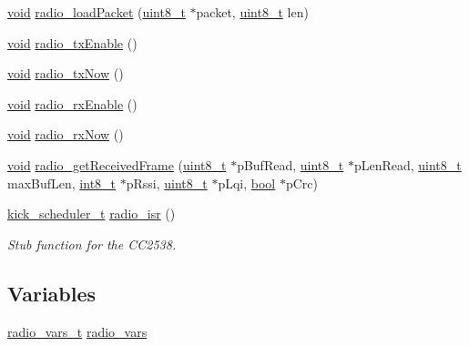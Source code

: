 \begin{DoxyCompactItemize}
\item 
\hyperlink{usb__devapi_8h_afabf60e7f57651d6d595a02c75f07cd0}{void} \hyperlink{group__radio_ga9adb1e30e5a3aaed77829b231e54700e}{radio\+\_\+load\+Packet} (\hyperlink{_p_e___types_8h_aba7bc1797add20fe3efdf37ced1182c5}{uint8\+\_\+t} $\ast$packet, \hyperlink{_p_e___types_8h_aba7bc1797add20fe3efdf37ced1182c5}{uint8\+\_\+t} len)
\item 
\hyperlink{usb__devapi_8h_afabf60e7f57651d6d595a02c75f07cd0}{void} \hyperlink{group__radio_ga23b8b3278db30bc9cec95510b584b3c7}{radio\+\_\+tx\+Enable} ()
\item 
\hyperlink{usb__devapi_8h_afabf60e7f57651d6d595a02c75f07cd0}{void} \hyperlink{group__radio_ga913f5f6cecb9bdde24278b4692850888}{radio\+\_\+tx\+Now} ()
\item 
\hyperlink{usb__devapi_8h_afabf60e7f57651d6d595a02c75f07cd0}{void} \hyperlink{group__radio_ga61f398fe7a5d131ef2d30e2d09424705}{radio\+\_\+rx\+Enable} ()
\item 
\hyperlink{usb__devapi_8h_afabf60e7f57651d6d595a02c75f07cd0}{void} \hyperlink{group__radio_ga332cd3358e1d2598d42716d702684473}{radio\+\_\+rx\+Now} ()
\item 
\hyperlink{usb__devapi_8h_afabf60e7f57651d6d595a02c75f07cd0}{void} \hyperlink{group__radio_ga1ba47d80eee0a4a3b6d23cfde6b94c9e}{radio\+\_\+get\+Received\+Frame} (\hyperlink{_p_e___types_8h_aba7bc1797add20fe3efdf37ced1182c5}{uint8\+\_\+t} $\ast$p\+Buf\+Read, \hyperlink{_p_e___types_8h_aba7bc1797add20fe3efdf37ced1182c5}{uint8\+\_\+t} $\ast$p\+Len\+Read, \hyperlink{_p_e___types_8h_aba7bc1797add20fe3efdf37ced1182c5}{uint8\+\_\+t} max\+Buf\+Len, \hyperlink{_p_e___types_8h_aef44329758059c91c76d334e8fc09700}{int8\+\_\+t} $\ast$p\+Rssi, \hyperlink{_p_e___types_8h_aba7bc1797add20fe3efdf37ced1182c5}{uint8\+\_\+t} $\ast$p\+Lqi, \hyperlink{_p_e___types_8h_a97a80ca1602ebf2303258971a2c938e2}{bool} $\ast$p\+Crc)
\item 
\hyperlink{group__board_gac9ebdcc0a4f3c8422f5f4f0fbbe0ded0}{kick\+\_\+scheduler\+\_\+t} \hyperlink{group__radio_ga42deb4291adeb8f9d6607133422f6023}{radio\+\_\+isr} ()
\begin{DoxyCompactList}\small\item\em Stub function for the C\+C2538. \end{DoxyCompactList}\end{DoxyCompactItemize}
\subsection*{Variables}
\begin{DoxyCompactItemize}
\item 
\hyperlink{structradio__vars__t}{radio\+\_\+vars\+\_\+t} \hyperlink{boards_2_open_mote-_c_c2538_2radio_8c_a9c243c87287c9b1043c251aae61fd656}{radio\+\_\+vars}
\end{DoxyCompactItemize}



